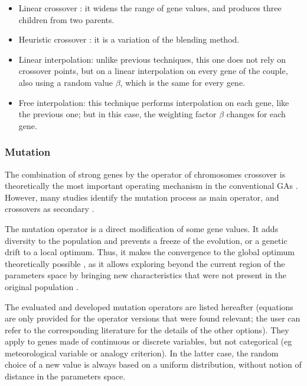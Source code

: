 \documentclass{ametsoc}
\begin{document}
\begin{itemize}
	\item Linear crossover \citep{Wright1991a}: it widens the range of gene values, and produces three children from two parents.
	
	\item Heuristic crossover \citep{Michalewicz1996}: it is a variation of the blending method.
	
	\item Linear interpolation: unlike previous techniques, this one does not rely on crossover points, but on a linear interpolation on every gene of the couple, also using a random value $\beta$, which is the same for every gene.
	
	\item Free interpolation: this technique performs interpolation on each gene, like the previous one; but in this case, the weighting factor $\beta$ changes for each gene.
	
\end{itemize}


\subsubsection{Mutation}
\label{sec:gas:mutation}

The combination of strong genes by the operator of chromosomes crossover is theoretically the most important operating mechanism in the conventional GAs \citep{Holland1992b,Back1993b}. However, many studies identify the mutation process as main operator, and crossovers as secondary \citep[see][]{Back1992a, Back1996a, Back1996b, Smith1997a, Deb1999, Costa2005a, Costa2007a}.

The mutation operator is a direct modification of some gene values. It adds diversity to the population and prevents a freeze of the evolution, or a genetic drift to a local optimum. Thus, it makes the convergence to the global optimum theoretically possible \citep{Beasley1993a}, as it allows exploring beyond the current region of the parameters space by bringing new characteristics that were not present in the original population \citep{Haupt2004}. 

The evaluated and developed mutation operators are listed hereafter (equations are only provided for the operator versions that were found relevant; the user can refer to the corresponding literature for the details of the other options). They apply to genes made of continuous or discrete variables, but not categorical (eg meteorological variable or analogy criterion). In the latter case, the random choice of a new value is always based on a uniform distribution, without notion of distance in the parameters space.
\end{document}
